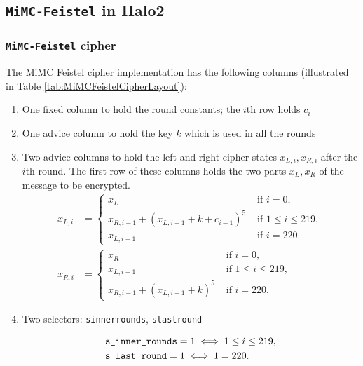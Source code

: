 \documentclass[10pt]{article}
\begin{document}
\subsection{\texttt{MiMC-Feistel} in Halo2}%
\label{subsec:mimc_feistel_in_halo2}
\subsubsection{\texttt{MiMC-Feistel} cipher}
The MiMC Feistel cipher implementation has the following columns (illustrated in Table \ref{tab:MiMCFeistelCipherLayout}):
\begin{enumerate}
  \item One fixed column to hold the round constants; the $i$th row holds $c_i$
  \item One advice column to hold the key $k$ which is used in all the rounds
  \item Two advice columns to hold the left and right cipher states $x_{L,i}, x_{R,i}$ after the $i$th round. The first row of these columns holds the two parts $x_L, x_R$ of the message to be encrypted.
    \begin{align*}
      x_{L,i} &= 
      \begin{cases}
        x_L & \text{ if } i = 0,\\
        x_{R, i-1} + \left( x_{L,i-1}+k+c_{i-1}\right)^5  & \text{ if } 1 \le i \le  219,\\
        x_{L,i-1}  & \text{ if } i=220.
      \end{cases}\\
      x_{R,i} &= 
      \begin{cases}
        x_R & \text{ if } i = 0,\\
         x_{L,i-1} & \text{ if } 1 \le i \le  219,\\
         x_{R,i-1} + \left( x_{L,i-1}+k\right)^5  & \text{ if } i=220.
      \end{cases}
    \end{align*}
  \item Two selectors: \texttt{s\textunderscore inner\textunderscore rounds}, \texttt{s\textunderscore last\textunderscore round}

    \begin{align*}
      & \texttt{s\textunderscore inner\textunderscore rounds} = 1  \iff 1 \le i\le 219,\\
      & \texttt{s\textunderscore last\textunderscore round} = 1  \iff 1 = 220.
    \end{align*}
\end{enumerate}
\end{document}
